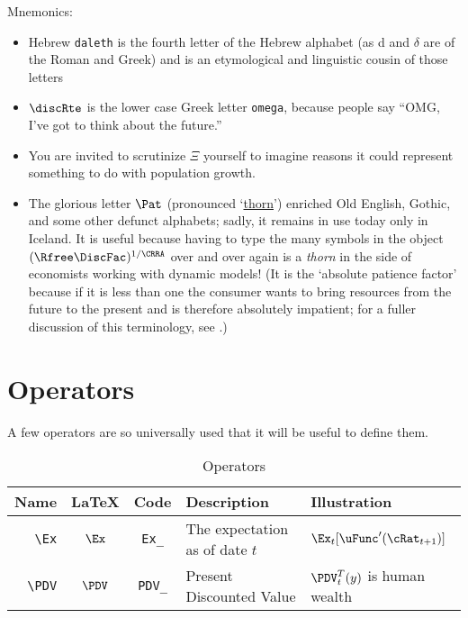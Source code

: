 \documentclass[12pt]{\econtex}
\begin{document}
Mnemonics:
\begin{itemize}
\item Hebrew \texttt{daleth} is the fourth letter of the Hebrew alphabet (as d and $\delta$ are of the Roman and Greek) and is an etymological and linguistic cousin of those letters
\item $\discRte$ is the lower case Greek letter \texttt{omega}, because people say ``OMG, I've got to think about the future.''
\item You are invited to scrutinize $\Xi$ yourself to imagine reasons it could represent something to do with population growth.
\item The glorious letter $\Pat$ (pronounced `\href{https://en.wikipedia.org/wiki/Thorn_(letter)}{thorn}') enriched Old English, Gothic, and some other defunct alphabets; sadly, it remains in use today only in Iceland.  It is useful because having to type the many symbols in the object $(\Rfree \DiscFac)^{1/\CRRA}$ over and over again is a \textit{thorn} in the side of economists working with dynamic models!  (It is the `absolute patience factor' because if it is less than one the consumer wants to bring resources from the future to the present and is therefore absolutely impatient; for a fuller discussion of this terminology, see \cite{carrollTractable}.)
\end{itemize}


\hypertarget{Operators}{}
\section{Operators}
A few operators are so universally used that it will be useful to define them.

\begin{table}[ht]
  \centering
  \begin{tabular}{|>{\ttfamily}rccll|}
    \hline
    Name    & \LaTeX         & Code & Description & Illustration
    \\ \hline
    \verb|\Ex|        & $\Ex$       & \texttt{Ex\_} & The expectation as of date $t$ & $\Ex_{t}[\uFunc^{\prime}(\cRat_{t+1})]$
    \\   \verb|\PDV|        & $\PDV$       & \texttt{PDV\_} & Present Discounted Value & $\PDV_{t}^{T}(y)$ is human wealth
    \\	\hline
  \end{tabular}
  \caption{Operators}
  \label{table:Operators}
\end{table}
\end{document}
